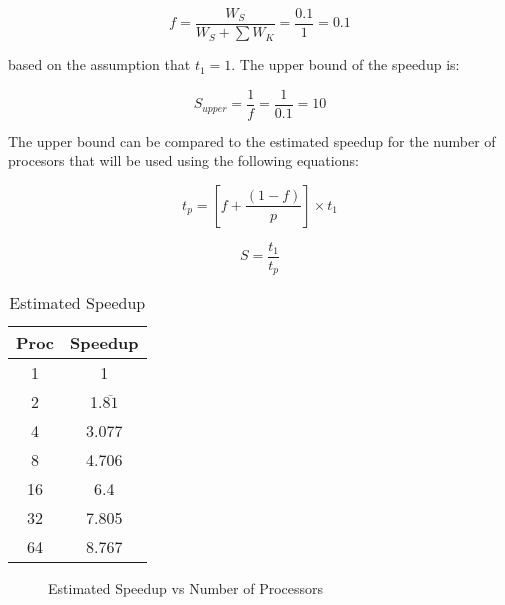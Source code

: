 \documentclass{article}
\begin{document}
  \[ f = \frac{W_S}{W_S + \sum W_K} = \frac{0.1}{1} = 0.1 \]

  based on the assumption that \( t_1 = 1 \). The upper bound of the speedup 
  is:

  \[ S_{upper} = \frac{1}{f} = \frac{1}{0.1} = 10 \]

  The upper bound can be compared to the estimated speedup for the number of
  procesors that will be used using the following equations:

  \[ t_p = \left[ f + \frac{\left( 1 - f \right)}{p} \right] \times t_1 \]

  \[ S = \frac{t_1}{t_p} \]

  \begin{table}[h]
    \centering

    \begin{tabular}{|c|c|}
      \hline
      Proc & Speedup \\
      \hline
      1  & 1                  \\
      2  & 1.$\overline{81}$  \\
      4  & 3.077              \\
      8  & 4.706              \\
      16 & 6.4                \\
      32 & 7.805              \\
      64 & 8.767              \\
      \hline
    \end{tabular}
    \caption{Estimated Speedup}
    \label{tab:estspeeduptab}
  \end{table}

  \begin{figure}[h]
    \centering

    \caption{Estimated Speedup vs Number of Processors}
    \label{fig:estspeedupfig}
  \end{figure}
\end{document}

